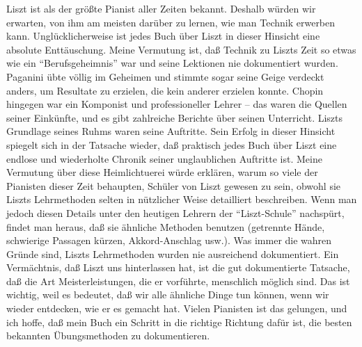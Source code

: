 Liszt ist als der größte Pianist aller Zeiten bekannt.
Deshalb würden wir erwarten, von ihm am meisten darüber zu lernen, wie man Technik erwerben kann.
Unglücklicherweise ist jedes Buch über Liszt in dieser Hinsicht eine absolute Enttäuschung.
Meine Vermutung ist, daß Technik zu Liszts Zeit so etwas wie ein \enquote{Berufsgeheimnis} war und seine Lektionen nie dokumentiert wurden.
Paganini übte völlig im Geheimen und stimmte sogar seine Geige verdeckt anders, um Resultate zu erzielen, die kein anderer erzielen konnte.
Chopin hingegen war ein Komponist und professioneller Lehrer -- das waren die Quellen seiner Einkünfte, und es gibt zahlreiche Berichte über seinen Unterricht.
Liszts Grundlage seines Ruhms waren seine Auftritte.
Sein Erfolg in dieser Hinsicht spiegelt sich in der Tatsache wieder, daß praktisch jedes Buch über Liszt eine endlose und wiederholte Chronik seiner unglaublichen Auftritte ist.
Meine Vermutung über diese Heimlichtuerei würde erklären, warum so viele der Pianisten dieser Zeit behaupten, Schüler von Liszt gewesen zu sein, obwohl sie Liszts Lehrmethoden selten in nützlicher Weise detailliert beschreiben.
Wenn man jedoch diesen Details unter den heutigen Lehrern der \enquote{Liszt-Schule} nachspürt, findet man heraus, daß sie ähnliche Methoden benutzen (getrennte Hände, schwierige Passagen kürzen, Akkord-Anschlag usw.).
Was immer die wahren Gründe sind, Liszts Lehrmethoden wurden nie ausreichend dokumentiert.
Ein Vermächtnis, daß Liszt uns hinterlassen hat, ist die gut dokumentierte Tatsache, daß die Art Meisterleistungen, die er vorführte, menschlich möglich sind.
Das ist wichtig, weil es bedeutet, daß wir alle ähnliche Dinge tun können, wenn wir wieder entdecken, wie er es gemacht hat.
Vielen Pianisten ist das gelungen, und ich hoffe, daß mein Buch ein Schritt in die richtige Richtung dafür ist, die besten bekannten Übungsmethoden zu dokumentieren.

